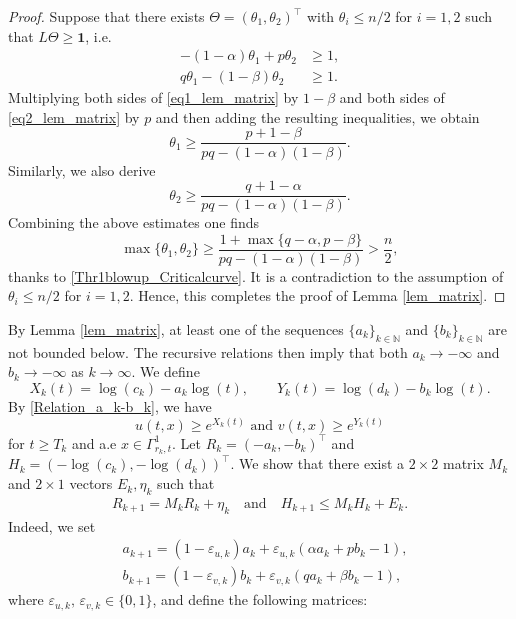 \documentclass[11pt,reqno]{amsart}
\begin{document}
	\begin{proof}
		Suppose that there exists $\Theta=(\theta_1,\theta_2)^{\top}$ with $\theta_i\leq n/2$ for $i=1,2$ such that $L\Theta\geq \boldsymbol{1}$, i.e.
		\begin{align}
			-(1-\alpha)\theta_1+p\theta_2&\geq 1,\label{eq1_lem_matrix}\\
			q\theta_1-(1-\beta)\theta_2&\geq 1.\label{eq2_lem_matrix}
		\end{align}
		Multiplying both sides of \eqref{eq1_lem_matrix} by $1-\beta$ and both sides of \eqref{eq2_lem_matrix} by $p$ and then adding the resulting inequalities, we obtain
		\[
		\theta_1\geq \frac{p+1-\beta}{pq-(1-\alpha)(1-\beta)}.
		\]
		Similarly, we also derive
		\[
		\theta_2\geq \frac{q+1-\alpha}{pq-(1-\alpha)(1-\beta)}.
		\]
		Combining the above estimates one finds
		\[
		\max\{\theta_1,\theta_2\}\geq \frac{1+\max\{q-\alpha,p-\beta\}}{pq-(1-\alpha)(1-\beta)}>\frac{n}{2},
		\]
		thanks to \eqref{Thr1blowup_Criticalcurve}. It is a contradiction to the assumption of $\theta_i\leq n/2$ for $i=1,2$. Hence, this completes the proof of Lemma \ref{lem_matrix}.
	\end{proof}
	By Lemma \ref{lem_matrix}, at least one of the sequences $\{a_k\}_{k\in\mathbb N}$ and $\{b_k\}_{k\in \mathbb N}$ are not bounded below. The recursive relations then imply that both $a_k\to-\infty$ and $b_k\to-\infty$ as $k\to\infty$. We define
	\begin{equation}\label{def_X_k_Y_k}
		X_k(t)=\log(c_k)-a_k\log(t),\qquad Y_k(t)=\log(d_k)-b_k\log(t).
	\end{equation}
	By \eqref{Relation_a_k-b_k}, we have
	\begin{equation}\label{es_u_v}
		u(t,x)\geq e^{X_k(t)} \text{ and }v(t,x)\geq e^{Y_k(t)} 
	\end{equation}
	for $t\geq T_k$ and a.e $x\in \Gamma^1_{r_k,t}$. Let $R_k=(-a_k,-b_k)^{\top}$ and $H_k=(-\log(c_k),-\log(d_k))^{\top}$. We show that there exist a $2\times 2$ matrix $M_k$ and $2\times 1$ vectors $E_k,\eta_k$ such that
	\begin{align*}
		R_{k+1}=M_kR_k+\eta_k\quad\text{and}\quad H_{k+1}\leq M_kH_k+E_k.
	\end{align*}
	Indeed, we set
	\begin{align*}
		&a_{k+1}=(1-\varepsilon_{u,k})a_k+\varepsilon_{u,k}\left(\alpha a_k+pb_k-1\right),\\
		&b_{k+1}=(1-\varepsilon_{v,k})b_k+\varepsilon_{v,k}\left(qa_k+\beta b_k-1\right),
	\end{align*}
	where $\varepsilon_{u,k},\,\varepsilon_{v,k}\in\{0,1\}$, and define the following matrices:
\end{document}
